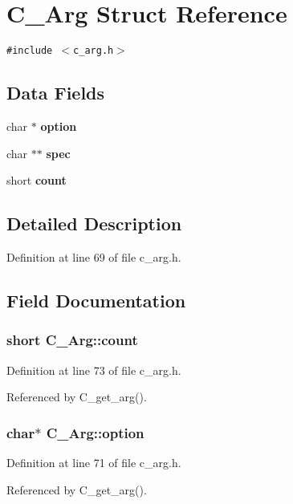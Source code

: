 \section{C\_\-Arg Struct Reference}
\label{structC__Arg}
{\tt \#include $<$c\_\-arg.h$>$}

\subsection*{Data Fields}
\begin{CompactItemize}
\item 
char $\ast$ \bf{option}
\item 
char $\ast$$\ast$ \bf{spec}
\item 
short \bf{count}
\end{CompactItemize}


\subsection{Detailed Description}




Definition at line 69 of file c\_\-arg.h.

\subsection{Field Documentation}
\subsubsection{\setlength{\rightskip}{0pt plus 5cm}short \bf{C\_\-Arg::count}}\label{structC__Arg_9bfb7ebbbf2bd6070208564ae958d77e}




Definition at line 73 of file c\_\-arg.h.

Referenced by C\_\-get\_\-arg().
\subsubsection{\setlength{\rightskip}{0pt plus 5cm}char$\ast$ \bf{C\_\-Arg::option}}\label{structC__Arg_a8c1803ced5d6fddf0a9318438a7bdf3}




Definition at line 71 of file c\_\-arg.h.

Referenced by C\_\-get\_\-arg().
